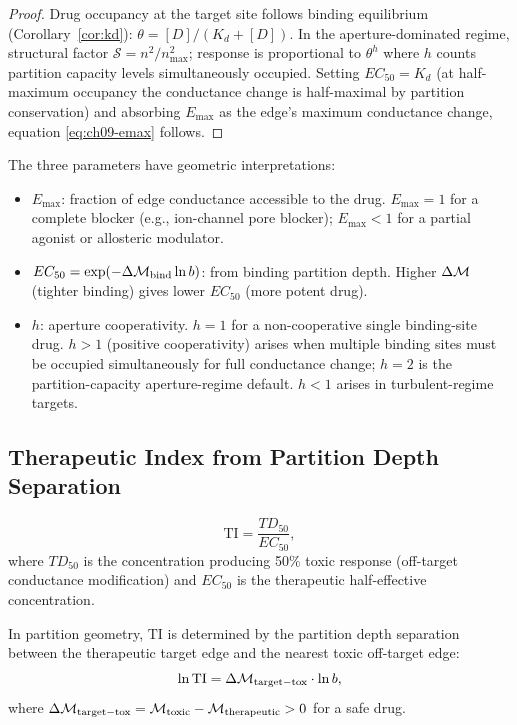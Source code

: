 \begin{proof}
Drug occupancy at the target site follows binding equilibrium
(Corollary~\ref{cor:kd}): $\theta = [D]/(K_d + [D])$.  In the
aperture-dominated regime, structural factor $\mathcal{S} = n^2/n_{\max}^2$;
response is proportional to $\theta^h$ where $h$ counts partition capacity
levels simultaneously occupied.  Setting $EC_{50} = K_d$ (at half-maximum
occupancy the conductance change is half-maximal by partition conservation)
and absorbing $E_{\max}$ as the edge's maximum conductance change, equation
\eqref{eq:ch09-emax} follows.
\end{proof}

The three parameters have geometric interpretations:
\begin{itemize}[leftmargin=2em]
  \item $E_{\max}$: fraction of edge conductance accessible to the drug.
    $E_{\max} = 1$ for a complete blocker (e.g., ion-channel pore blocker);
    $E_{\max} < 1$ for a partial agonist or allosteric modulator.
  \item $EC_{50} = \exp(-\Delta\mathcal{M}_{\mathrm{bind}}\ln b)$: from binding
    partition depth.  Higher $\Delta\mathcal{M}$ (tighter binding) gives lower
    $EC_{50}$ (more potent drug).
  \item $h$: aperture cooperativity.  $h = 1$ for a non-cooperative single
    binding-site drug.  $h > 1$ (positive cooperativity) arises when
    multiple binding sites must be occupied simultaneously for full
    conductance change; $h = 2$ is the partition-capacity aperture-regime
    default.  $h < 1$ arises in turbulent-regime targets.
\end{itemize}

\subsection{Therapeutic Index from Partition Depth Separation}
\label{subsec:ch09-TI}

\begin{definition}
\label{def:ch09-TI}
\begin{equation}
  \mathrm{TI} = \frac{TD_{50}}{EC_{50}},
  \label{eq:ch09-TI}
\end{equation}
where $TD_{50}$ is the concentration producing 50\% toxic response
(off-target conductance modification) and $EC_{50}$ is the therapeutic
half-effective concentration.
\end{definition}

In partition geometry, $\mathrm{TI}$ is determined by the partition depth
separation between the therapeutic target edge and the nearest toxic
off-target edge:
\begin{equation}
  \ln\mathrm{TI} = \Delta\mathcal{M}_{\mathrm{target-tox}}\cdot\ln b,
  \label{eq:ch09-TI-depth}
\end{equation}
where $\Delta\mathcal{M}_{\mathrm{target-tox}} = \mathcal{M}_{\mathrm{toxic}} -
\mathcal{M}_{\mathrm{therapeutic}} > 0$ for a safe drug.

